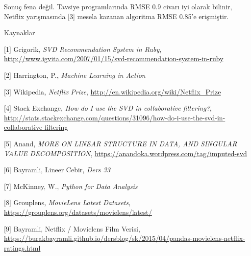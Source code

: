 \documentclass[12pt,fleqn]{article}\usepackage{../../common}
\begin{document}
Sonuç fena değil. Tavsiye programlarında RMSE 0.9 civarı iyi olarak
bilinir, Netflix yarışmasında [3] mesela kazanan algoritma RMSE 0.85'e
erişmiştir.

Kaynaklar

[1] Grigorik, {\em SVD Recommendation System in Ruby},
    \url{http://www.igvita.com/2007/01/15/svd-recommendation-system-in-ruby}

[2] Harrington, P., {\em Machine Learning in Action}

[3] Wikipedia, {\em Netflix Prize},
    \url{http://en.wikipedia.org/wiki/Netflix_Prize}

[4] Stack Exchange, {\em How do I use the SVD in collaborative filtering?}, \url{http://stats.stackexchange.com/questions/31096/how-do-i-use-the-svd-in-collaborative-filtering}

[5] Anand, {\em MORE ON LINEAR STRUCTURE IN DATA, AND SINGULAR VALUE DECOMPOSITION},
    \url{https://anandoka.wordpress.com/tag/imputed-svd}

[6] Bayramli, Lineer Cebir, {\em Ders 33}

[7] McKinney, W., {\em Python for Data Analysis}

[8] Grouplens, {\em MovieLens Latest Datasets},
    \url{https://grouplens.org/datasets/movielens/latest/}

[9] Bayramli, Netflix / Movielens Film Verisi,
    \url{https://burakbayramli.github.io/dersblog/sk/2015/04/pandas-movielens-netflix-ratings.html}
\end{document}
